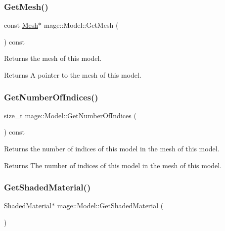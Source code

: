 \subsubsection{\texorpdfstring{Get\+Mesh()}{GetMesh()}}
{\footnotesize\ttfamily const \hyperlink{classmage_1_1_mesh}{Mesh}$\ast$ mage\+::\+Model\+::\+Get\+Mesh (\begin{DoxyParamCaption}{ }\end{DoxyParamCaption}) const}

Returns the mesh of this model.

\begin{DoxyReturn}{Returns}
A pointer to the mesh of this model. 
\end{DoxyReturn}
\hypertarget{classmage_1_1_model_ac118db61c4541d16d9b1b52e55524956}{}\label{classmage_1_1_model_ac118db61c4541d16d9b1b52e55524956} 
\subsubsection{\texorpdfstring{Get\+Number\+Of\+Indices()}{GetNumberOfIndices()}}
{\footnotesize\ttfamily size\+\_\+t mage\+::\+Model\+::\+Get\+Number\+Of\+Indices (\begin{DoxyParamCaption}{ }\end{DoxyParamCaption}) const}

Returns the number of indices of this model in the mesh of this model.

\begin{DoxyReturn}{Returns}
The number of indices of this model in the mesh of this model. 
\end{DoxyReturn}
\hypertarget{classmage_1_1_model_af709f5b1ec136cbab25bda39e20e1662}{}\label{classmage_1_1_model_af709f5b1ec136cbab25bda39e20e1662} 
\subsubsection{\texorpdfstring{Get\+Shaded\+Material()}{GetShadedMaterial()}\hspace{0.1cm}{\footnotesize\ttfamily [1/2]}}
{\footnotesize\ttfamily \hyperlink{structmage_1_1_shaded_material}{Shaded\+Material}$\ast$ mage\+::\+Model\+::\+Get\+Shaded\+Material (\begin{DoxyParamCaption}{ }\end{DoxyParamCaption})}

